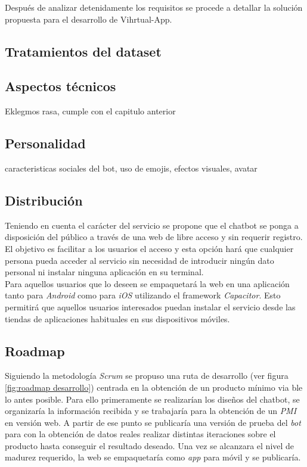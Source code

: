 Después de analizar detenidamente los requisitos se procede a detallar la solución propuesta para el desarrollo de Vihrtual-App.

\subsection{Tratamientos del dataset}

\subsection{Aspectos técnicos}
Eklegmos rasa, cumple con el capitulo anterior

\subsection{Personalidad}
caracteristicas sociales del bot, uso de emojis, efectos visuales, avatar

\subsection{Distribución}
Teniendo en cuenta el carácter del servicio se propone que el chatbot se ponga a disposición del público a través de una web de libre acceso y sin requerir registro. El objetivo es facilitar a los usuarios el acceso  y esta opción hará que cualquier persona pueda acceder al servicio sin necesidad de introducir ningún dato personal ni instalar ninguna aplicación en su terminal. \\

Para aquellos usuarios que lo deseen se empaquetará la web en una aplicación tanto para \textit{Android} como para \textit{iOS} utilizando el framework \textit{Capacitor}. Esto permitirá que aquellos usuarios interesados puedan instalar el servicio desde las tiendas de aplicaciones habituales en sus dispositivos móviles.\\

\subsection{Roadmap}
Siguiendo la metodología \textit{Scrum} se propuso una ruta de desarrollo (ver figura \ref{fig:roadmap desarrollo}) centrada en la obtención de un producto mínimo via	ble lo antes posible. Para ello primeramente se realizarían los diseños del chatbot, se organizaría la información recibida y se trabajaría para la obtención de un \textit{PMI} en versión web. A partir de ese punto se publicaría una versión de prueba del \textit{bot} para con la obtención de datos reales realizar distintas iteraciones sobre el producto hasta conseguir el resultado deseado. Una vez se alcanzara el nivel de madurez requerido, la web se empaquetaría como \textit{app} para móvil y se publicaría.\\

